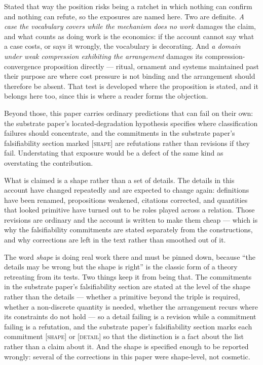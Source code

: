 \documentclass[11pt,a4paper]{article}
\theoremstyle{remark}\newtheorem{remark}[definition]{Remark}
\begin{document}
Stated that way the position risks being a ratchet in which nothing can confirm and nothing can
refute, so the exposures are named here. Two are definite.
\emph{A case the vocabulary covers while the mechanism does no work} damages the claim, and what
counts as doing work is the economics: if the account cannot say what a case costs, or says it
wrongly, the vocabulary is decorating. And \emph{a domain under weak compression exhibiting the
arrangement} damages its compression-convergence proposition directly --- ritual, ornament and
systems maintained past their purpose are where cost pressure is not binding and the arrangement
should therefore be absent. That test is developed where the proposition is stated, and it belongs
here too, since this is where a reader forms the objection.

Beyond those, this paper carries ordinary predictions that can fail on their own:
the substrate paper's located-degradation hypothesis specifies where classification failures should concentrate,
and the commitments in the substrate paper's falsifiability section marked \textsc{[shape]} are refutations rather
than revisions if they fail. Understating that exposure would be a defect of the same kind as
overstating the contribution.

What is claimed is a shape rather than a set of details. The details in this account have changed
repeatedly and are expected to change again: definitions have been renamed, propositions weakened,
citations corrected, and quantities that looked primitive have turned out to be roles played across a
relation. Those revisions are ordinary and the account is written to make them cheap --- which is why
the falsifiability commitments are stated separately from the constructions, and why corrections are
left in the text rather than smoothed out of it.

The word \emph{shape} is doing real work there and must be pinned down, because ``the details may be
wrong but the shape is right'' is the classic form of a theory retreating from its tests. Two things
keep it from being that. The commitments in the substrate paper's falsifiability section are stated at the level
of the shape rather than the details --- whether a primitive beyond the triple is required, whether a
non-discrete quantity is needed, whether the arrangement recurs where its constraints do not hold ---
so a detail failing is a revision while a commitment failing is a refutation, and
the substrate paper's falsifiability section marks each commitment \textsc{[shape]} or \textsc{[detail]} so that
the distinction is a fact about the list rather than a claim about it. And the shape is specified enough to be reported wrongly: several of the corrections in
this paper were shape-level, not cosmetic.
\end{document}
